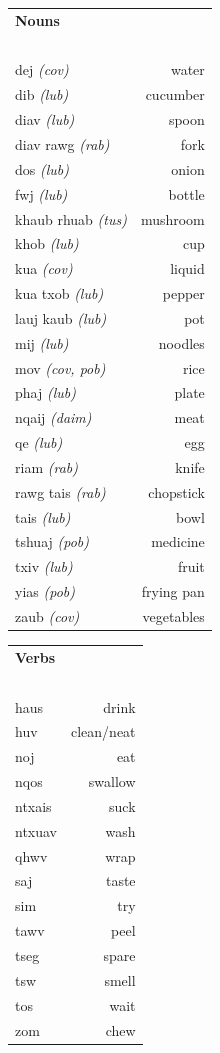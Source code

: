 \documentclass{article}
\begin{document}
\clearpage

\begin{multicols}{2}
[
\section*{}
]

\begin{tabular}{l r}
\textbf{Nouns} \\
~\\
dej {\em (cov)} &water\\
dib {\em (lub)} &cucumber\\
diav {\em (lub)} &spoon\\
diav rawg {\em (rab)} &fork\\
dos {\em (lub)} &onion\\
fwj {\em (lub)} &bottle\\
khaub rhuab {\em (tus)} &mushroom\\
khob {\em (lub)} &cup\\
kua {\em (cov)} &liquid\\
kua txob {\em (lub)} &pepper\\
lauj kaub {\em (lub)} &pot\\
mij {\em (lub)} &noodles\\
mov {\em (cov, pob)} &rice\\
phaj {\em (lub)} &plate\\
nqaij {\em (daim)} &meat\\
qe {\em (lub)} &egg\\
riam {\em (rab)} &knife\\
rawg tais {\em (rab)} &chopstick\\
tais {\em (lub)} &bowl\\
tshuaj {\em (pob)} &medicine\\
txiv {\em (lub)} &fruit\\
yias {\em (pob)} &frying pan\\
zaub {\em (cov)} &vegetables\\
\end{tabular}

\begin{tabular}{l r}
\textbf{Verbs} \\
~\\
haus &drink\\
huv &clean/neat\\
noj &eat\\
nqos &swallow\\
ntxais &suck\\
ntxuav &wash\\
qhwv &wrap\\
saj &taste\\
sim &try\\
tawv &peel\\
tseg &spare\\
tsw &smell\\
tos &wait\\
zom &chew\\

\end{tabular}
\end{multicols}
\end{document}
